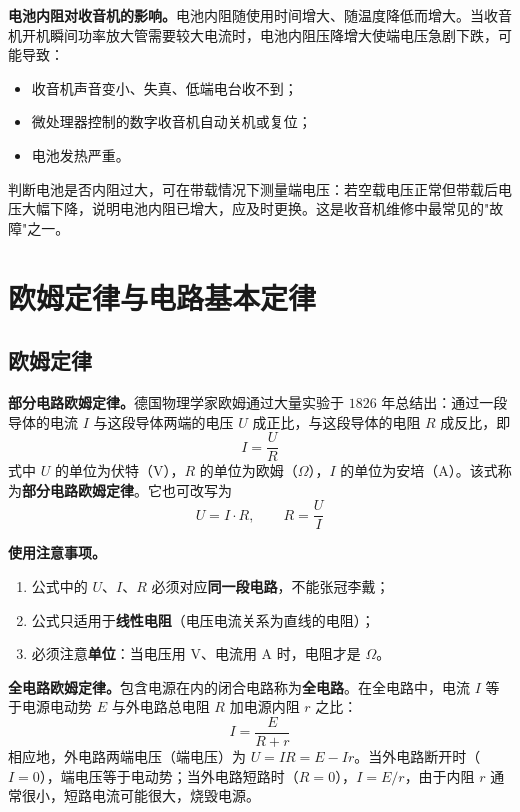 \documentclass[12pt,UTF8]{ctexbook}
\begin{document}
\textbf{电池内阻对收音机的影响。}电池内阻随使用时间增大、随温度降低而增大。当收音机开机瞬间功率放大管需要较大电流时，电池内阻压降增大使端电压急剧下跌，可能导致：
\begin{itemize}
\item 收音机声音变小、失真、低端电台收不到；
\item 微处理器控制的数字收音机自动关机或复位；
\item 电池发热严重。
\end{itemize}
判断电池是否内阻过大，可在带载情况下测量端电压：若空载电压正常但带载后电压大幅下降，说明电池内阻已增大，应及时更换。这是收音机维修中最常见的"故障"之一。

\section{欧姆定律与电路基本定律}
\label{sec:ohm_law}

\subsection{欧姆定律}

\textbf{部分电路欧姆定律。}德国物理学家欧姆通过大量实验于 $1826$ 年总结出：通过一段导体的电流 $I$ 与这段导体两端的电压 $U$ 成正比，与这段导体的电阻 $R$ 成反比，即
\[
I = \frac{U}{R}
\]
式中 $U$ 的单位为伏特（V），$R$ 的单位为欧姆（$\Omega$），$I$ 的单位为安培（A）。该式称为\textbf{部分电路欧姆定律}。它也可改写为
\[
U = I \cdot R, \qquad R = \frac{U}{I}
\]

\textbf{使用注意事项。}

\begin{enumerate}
\item 公式中的 $U$、$I$、$R$ 必须对应\textbf{同一段电路}，不能张冠李戴；
\item 公式只适用于\textbf{线性电阻}（电压电流关系为直线的电阻）；
\item 必须注意\textbf{单位}：当电压用 V、电流用 A 时，电阻才是 $\Omega$。
\end{enumerate}

\textbf{全电路欧姆定律。}包含电源在内的闭合电路称为\textbf{全电路}。在全电路中，电流 $I$ 等于电源电动势 $E$ 与外电路总电阻 $R$ 加电源内阻 $r$ 之比：
\[
I = \frac{E}{R + r}
\]
相应地，外电路两端电压（端电压）为 $U = IR = E - Ir$。当外电路断开时（$I=0$），端电压等于电动势；当外电路短路时（$R=0$），$I = E/r$，由于内阻 $r$ 通常很小，短路电流可能很大，烧毁电源。

\end{document}
